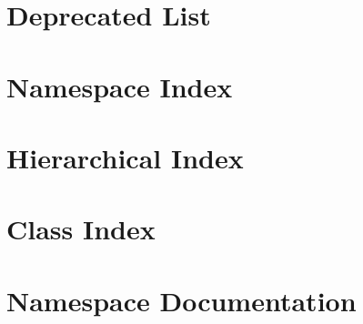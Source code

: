 \let\mypdfximage\pdfximage\def\pdfximage{\immediate\mypdfximage}\documentclass[twoside]{book}
\newcommand{\+}{\discretionary{\mbox{\scriptsize$\hookleftarrow$}}{}{}}
\begin{document}
\chapter{Deprecated List}
\label{deprecated}

\chapter{Namespace Index}

\chapter{Hierarchical Index}

\chapter{Class Index}

\chapter{Namespace Documentation}










\end{document}
